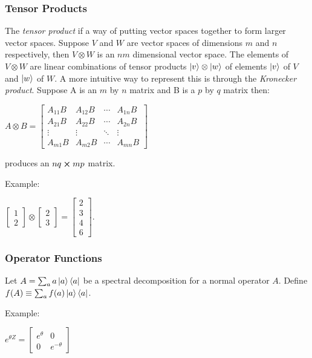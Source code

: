\documentclass{article}
\begin{document}
\subsubsection{Tensor Products}
The \emph{tensor product} if a way of putting vector spaces together to form
larger vector spaces. Suppose $V$ and $W$ are vector spaces of dimensions $m$
and $n$ respectively, then $V \otimes W$ is an $nm$ dimensional vector space.
The elements of $V \otimes W$ are linear combinations of tensor products
$\ket{v}\otimes\ket{w}$ of elements $\ket{v}$ of $V$ and $\ket{w}$ of $W$. A
more intuitive way to represent this is through the \emph{Kronecker product}.
Suppose A is an $m$ by $n$ matrix and B is a $p$ by $q$ matrix then:
  \begin{center}
  $ A \otimes B = 
  \begin{bmatrix}
    A_{11}B & A_{12}B & \cdots & A_{1n}B \\
    A_{21}B & A_{22}B & \cdots & A_{2n}B \\
    \vdots  & \vdots  & \ddots & \vdots  \\
    A_{m1}B & A_{m2}B & \cdots & A_{mn}B
  \end{bmatrix}$
  \end{center}
produces an $nq \cross mp$ matrix.

Example:
  \begin{center}
    $
    \begin{bmatrix}
      1 \\ 2
    \end{bmatrix} \otimes
    \begin{bmatrix}
      2 \\ 3
    \end{bmatrix} = 
    \begin{bmatrix}
      2 \\ 3 \\ 4 \\ 6
    \end{bmatrix}
    $.
  \end{center}

\subsubsection{Operator Functions}
Let $A = \sum_{a}a\ket{a}\bra{a}$ be a spectral decomposition for a normal
operator $A$. Define $f(A) \equiv \sum_{a}f(a)\ket{a}\bra{a}$.

Example:
  \begin{center}
  $e^{\theta Z} =
    \begin{bmatrix}
      e^{\theta} & 0 \\
      0 & e^{-\theta}
    \end{bmatrix}$
  \end{center}
\end{document}
